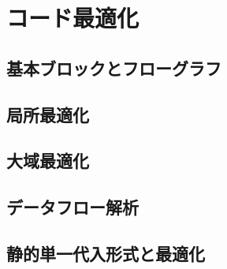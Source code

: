 \documentclass[dvipdfmx,a4j]{jbook}
\begin{document}
\chapter{コード最適化}
\section{基本ブロックとフローグラフ}
\section{局所最適化}
\section{大域最適化}
\section{データフロー解析}
\section{静的単一代入形式と最適化}
\end{document}
